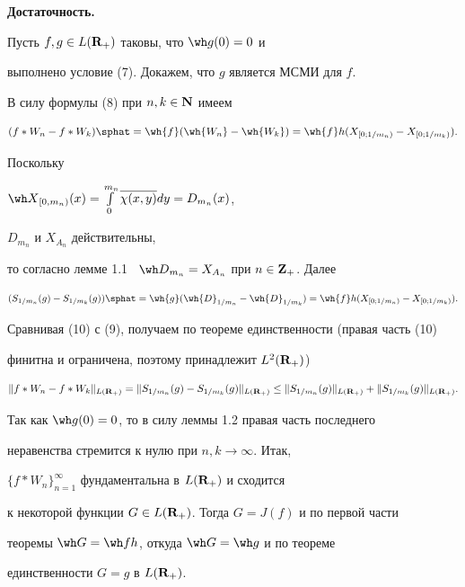 \begin{pf}
{\bf Достаточность.}


Пусть $f,g\in L({\bold R}_+)$ таковы, что ${\wh g}(0)=0$ и 


выполнено условие (7). Докажем, что $g$ является МСМИ для $f$. 


В силу формулы (8) при $n,k\in {\bold N}$ имеем


\begin{equation}


(f*W_n - f*W_k){\sphat}=\wh{f}(\wh{W_n}-\wh{W_k})=


\wh {f}h (X_{[0;1/m_n)}-X_{[0;1/m_k)}).


\end{equation}


Поскольку


${\wh X}_{[0,m_n)}(x)=\int\limits^{m_n}_0\overline{\chi(x,y)}dy=D_{m_n}(x)$,


$D_{m_n}$ и $X_{A_n}$ действительны,


то согласно лемме 1.1 \ ${\wh D}_{m_n}=X_{A_n}$ при $n\in {\bold Z}_+$. Далее


\begin{equation}


(S_{1/m_n}(g)-S_{1/m_k}(g)){\sphat}=\wh{g}(\wh {D}_{1/m_n}-\wh {D}_{1/m_k})=


\wh{f}h(X_{[0;1/m_n)}-X_{[0;1/m_k)}).


\end{equation}


Сравнивая (10) с (9), получаем по теореме единственности (правая часть (10) 


финитна и ограничена, поэтому принадлежит $L^2({\bold R}_+)$)


$$


\|f*W_n-f*W_k\|_{L({\bold R}_+)}=


\|S_{1/m_n}(g)-S_{1/m_k}(g)\|_{L({\bold R}_+)}\leq


\|S_{1/m_n}(g)\|_{L({\bold R}_+)}+


\|S_{1/m_k}(g)\|_{L({\bold R}_+)}.


$$


Так как ${\wh g}(0)=0$, то в силу леммы 1.2 правая часть последнего 


неравенства стремится к нулю при $n,k\to\infty$. Итак,


$\{f*W_n\}_{n=1}^{\infty}$ фундаментальна в $L({\bold R}_+)$ и сходится 


к некоторой функции $G\in L({\bold R}_+)$. Тогда $G=J(f)$ и по первой части 


теоремы ${\wh G}={\wh f}h$, откуда ${\wh G}={\wh g}$ и по теореме 


единственности $G=g$ в $L({\bold R}_+)$.


\end{pf}








